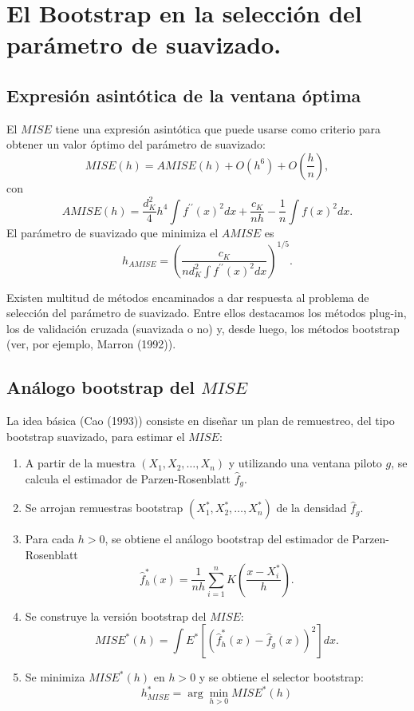 \documentclass[]{book}
\theoremstyle{break}
\theoremstyle{definition}
\theoremstyle{definition}
\theoremstyle{definition}
\theoremstyle{remark}
\begin{document}
\section{El Bootstrap en la selección del parámetro de
suavizado.}\label{el-bootstrap-en-la-selecciuxf3n-del-paruxe1metro-de-suavizado.}

\subsection{Expresión asintótica de la ventana
óptima}\label{expresiuxf3n-asintuxf3tica-de-la-ventana-uxf3ptima}

El \(MISE\) tiene una expresión asintótica que puede usarse como
criterio para obtener un valor óptimo del parámetro de
suavizado:\[MISE\left( h \right) =AMISE\left( h \right) +O\left( h^{6} \right) +O\left( 
\frac{h}{n} \right),\]con\[AMISE\left( h \right) =\frac{d_{K}^2}{4}h^{4}\int f^{\prime \prime }\left(
x \right)^2dx+\frac{c_{K}}{nh}-\frac{1}{n}\int f\left( x \right)^2dx.\]El
parámetro de suavizado que minimiza el \(AMISE\)
es\[h_{AMISE}=\left( \frac{c_{K}}{nd_{K}^2\int f^{\prime \prime }\left(
x \right)^2dx} \right)^{1/5}.\]

Existen multitud de métodos encaminados a dar respuesta al problema de
selección del parámetro de suavizado. Entre ellos destacamos los métodos
plug-in, los de validación cruzada (suavizada o no) y, desde luego, los
métodos bootstrap (ver, por ejemplo, Marron (1992)).

\subsection{\texorpdfstring{Análogo bootstrap del
\(MISE\)}{Análogo bootstrap del MISE}}\label{anuxe1logo-bootstrap-del-mise}

La idea básica (Cao (1993)) consiste en diseñar un plan de remuestreo,
del tipo bootstrap suavizado, para estimar el \(MISE\):

\begin{enumerate}
\def\labelenumi{\arabic{enumi}.}
\item
  A partir de la muestra \(\left( X_1,X_2,\ldots ,X_n \right)\) y
  utilizando una ventana piloto \(g\), se calcula el estimador de
  Parzen-Rosenblatt \(\hat{f}_{g}\).
\item
  Se arrojan remuestras bootstrap
  \(\left( X_1^{\ast},X_2^{\ast },\ldots ,X_n^{\ast} \right)\) de la
  densidad \(\hat{f}_{g}\).
\item
  Para cada \(h>0\), se obtiene el análogo bootstrap del estimador de
  Parzen-Rosenblatt
  \[\hat{f}_{h}^{\ast}\left( x \right) =\frac{1}{nh}\sum_{i=1}^{n}K\left( \frac{
  x-X_i^{\ast}}{h} \right).\]
\item
  Se construye la versión bootstrap del
  \(MISE\):\[MISE^{\ast}\left( h \right) =\int E^{\ast}\left[ \left( \hat{f}_{h}^{\ast
  }\left( x \right) -\hat{f}_{g}\left( x \right) \right)^2\right] dx.\]
\item
  Se minimiza \(MISE^{\ast}\left( h \right)\) en \(h>0\) y se obtiene el
  selector bootstrap:
  \[h_{MISE}^{\ast}=\arg \min_{h>0}MISE^{\ast}\left( h \right)\]
\end{enumerate}
\end{document}
